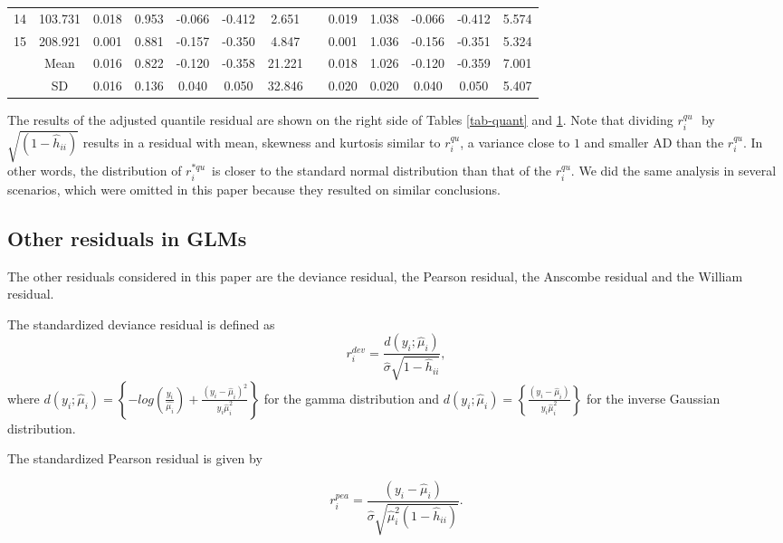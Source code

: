\documentclass[11pt,authoryear,review,3p,times]{elsarticle}
\newcommand{\qu}{$r_i^{qu}$}
\newcommand{\aqu}{$r_i^{*qu}$}
\begin{document}
\begin{table}[h!]
{\begin{tabular}{ccccccccccccc}
		14    & 103.731 & 0.018 & 0.953 & -0.066 & -0.412 & 2.651 &       & 0.019 & 1.038 & -0.066 & -0.412 & 5.574 \\
		15    & 208.921 & 0.001 & 0.881 & -0.157 & -0.350 & 4.847 &       & 0.001 & 1.036 & -0.156 & -0.351 & 5.324 \\
		\hline
		& Mean  & 0.016 & 0.822 & -0.120 & -0.358 & 21.221 &       & 0.018 & 1.026 & -0.120 & -0.359 & 7.001 \\
		& SD & 0.016 & 0.136 & 0.040 & 0.050 & 32.846 &       & 0.020 & 0.020 & 0.040 & 0.050 & 5.407 \\
		\hline
	\end{tabular}%
}
	\label{tab-quant1}%
\end{table}%



The results of the adjusted quantile residual are shown on the right side of Tables \ref{tab-quant} and \ref{tab-quant1}. 
Note that dividing \qu\,\, by $\sqrt{(1-\hat{h}_{ii})}$ results in a residual with mean, skewness and kurtosis similar to \qu, a variance close to $1$ and smaller AD than the \qu.
 In other words, the distribution of \aqu\, is closer to the standard normal distribution than that of the \qu.
We did the same analysis in several scenarios, which were omitted in this paper because they resulted on similar conclusions.
	

\subsection{Other residuals in GLMs}
\label{others}
The other residuals considered in this paper are the deviance residual, the Pearson residual, the Anscombe residual and the William residual. 

The standardized deviance residual is defined as
	\begin{equation}
	r_i^{dev}=\frac{d(y_i;\hat{\mu}_i)}{\hat{\sigma}\sqrt{1-\hat{h}_{ii}}},
	\end{equation}
where $d(y_i;\hat{\mu}_i)=\left\{-log(\frac{y_i}{\hat{\mu_i}})+\frac{(y_i-\hat{\mu}_i)^2}{y_i\hat{\mu}_i^2}\right\}$ for the gamma distribution and 
$d(y_i;\hat{\mu}_i)=\left\{\frac{(y_i-\hat{\mu}_i)}{y_i\hat{\mu}_i^2}\right\}$ for the inverse Gaussian distribution.
  
  
  The standardized Pearson residual is given by 
 
 	\begin{equation}
 	r_i^{pea}=\frac{(y_i-\hat{\mu}_i)}{\hat{\sigma}\sqrt{\hat{\mu}_i^2(1-\hat{h}_{ii})}}.
 	\label{pea}
 	\end{equation}
\end{document}
